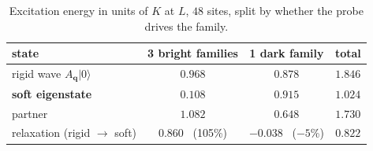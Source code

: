 \documentclass[11pt]{article}
\newcommand{\bq}{\bm q}
\begin{document}
\begin{table}[h]
\centering
\caption{Excitation energy in units of $K$ at $L$, $48$ sites, split by
whether the probe drives the family.}
\label{tab:bill}
\begin{tabular}{lccc}
\toprule
state & 3 bright families & 1 dark family & total\\
\midrule
rigid wave $A_{\bq}|0\rangle$ & $0.968$ & $0.878$ & $1.846$\\
\textbf{soft eigenstate}      & $\bm{0.108}$ & $0.915$ & $\bm{1.024}$\\
partner                       & $1.082$ & $0.648$ & $1.730$\\
\midrule
relaxation (rigid $\to$ soft) & $0.860$ \ (105\%) & $-0.038$ \ ($-5$\%)
 & $0.822$\\
\bottomrule
\end{tabular}
\end{table}
\end{document}
